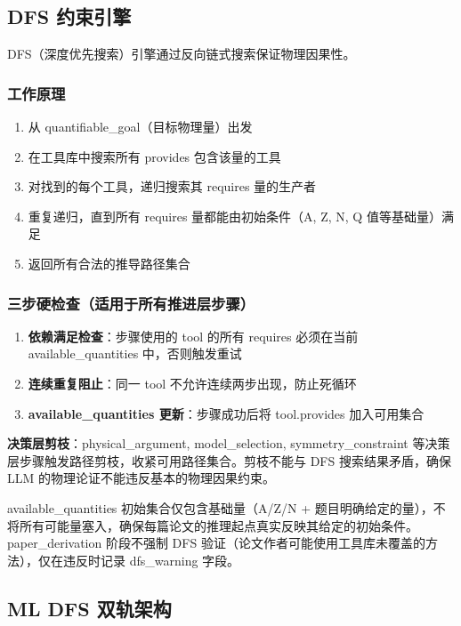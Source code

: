 \documentclass[12pt,a4paper]{article}
\begin{document}
\subsection{DFS 约束引擎}

DFS（深度优先搜索）引擎通过反向链式搜索保证物理因果性。

\subsubsection{工作原理}
\begin{enumerate}
\item 从 quantifiable\_goal（目标物理量）出发
\item 在工具库中搜索所有 provides 包含该量的工具
\item 对找到的每个工具，递归搜索其 requires 量的生产者
\item 重复递归，直到所有 requires 量都能由初始条件（A, Z, N, Q 值等基础量）满足
\item 返回所有合法的推导路径集合
\end{enumerate}

\subsubsection{三步硬检查（适用于所有推进层步骤）}
\begin{enumerate}
\item \textbf{依赖满足检查}：步骤使用的 tool 的所有 requires 必须在当前 available\_quantities 中，否则触发重试
\item \textbf{连续重复阻止}：同一 tool 不允许连续两步出现，防止死循环
\item \textbf{available\_quantities 更新}：步骤成功后将 tool.provides 加入可用集合
\end{enumerate}

\textbf{决策层剪枝}：physical\_argument, model\_selection, symmetry\_constraint 等决策层步骤触发路径剪枝，收紧可用路径集合。剪枝不能与 DFS 搜索结果矛盾，确保 LLM 的物理论证不能违反基本的物理因果约束。

available\_quantities 初始集合仅包含基础量（A/Z/N + 题目明确给定的量），不将所有可能量塞入，确保每篇论文的推理起点真实反映其给定的初始条件。paper\_derivation 阶段不强制 DFS 验证（论文作者可能使用工具库未覆盖的方法），仅在违反时记录 dfs\_warning 字段。

\subsection{ML DFS 双轨架构}
\end{document}
